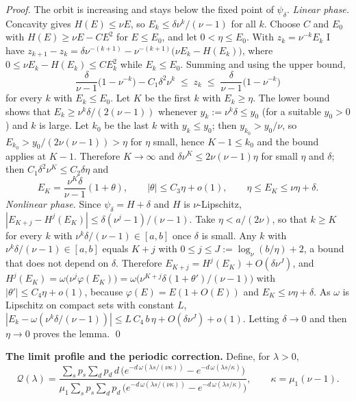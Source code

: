 \documentclass{nws}
\begin{document}
\emph{Proof.} The orbit is increasing and stays below the fixed point of $\psi_\delta$.
\emph{Linear phase.} Concavity gives $H(E)\le\nu E$, so $E_k\le\delta\nu^k/(\nu-1)$
for all $k$. Choose $C$ and $E_0$ with $H(E)\ge\nu E-CE^2$ for $E\le E_0$, and let
$0<\eta\le E_0$. With $z_k=\nu^{-k}E_k$ I have
$z_{k+1}-z_k=\delta\nu^{-(k+1)}-\nu^{-(k+1)}\bigl(\nu E_k-H(E_k)\bigr)$, where
$0\le\nu E_k-H(E_k)\le CE_k^2$ while $E_k\le E_0$. Summing and using the upper bound,
\[
\frac{\delta}{\nu-1}\bigl(1-\nu^{-k}\bigr)-C_1\delta^2\nu^{k}\;\le\;z_k\;\le\;\frac{\delta}{\nu-1}\bigl(1-\nu^{-k}\bigr)
\]
for every $k$ with $E_k\le E_0$. Let $K$ be the first $k$ with $E_k\ge\eta$. The lower
bound shows that $E_k\ge\nu^k\delta/(2(\nu-1))$ whenever $y_k:=\nu^k\delta\le y_0$ (for a suitable $y_0>0$) and $k$ is large. Let $k_0$ be the last $k$ with $y_k\le y_0$; then $y_{k_0}>y_0/\nu$, so $E_{k_0}>y_0/(2\nu(\nu-1))>\eta$ for $\eta$ small, hence $K-1\le k_0$ and the bound applies at $K-1$. Therefore $K\to\infty$ and $\delta\nu^K\le2\nu(\nu-1)\eta$ for small $\eta$ and
$\delta$; then $C_1\delta^2\nu^K\le C_2\delta\eta$ and
\[
E_K=\frac{\nu^K\delta}{\nu-1}(1+\theta),\qquad |\theta|\le C_3\eta+o(1),\qquad \eta\le E_K\le\nu\eta+\delta .
\]
\emph{Nonlinear phase.} Since $\psi_\delta=H+\delta$ and $H$ is $\nu$-Lipschitz,
$|E_{K+j}-H^j(E_K)|\le\delta(\nu^j-1)/(\nu-1)$. Take $\eta<a/(2\nu)$, so that $k\ge K$ for every $k$ with $\nu^k\delta/(\nu-1)\in[a,b]$ once $\delta$ is small. Any $k$ with
$\nu^k\delta/(\nu-1)\in[a,b]$ equals $K+j$ with $0\le j\le J:=\log_\nu(b/\eta)+2$,
a bound that does not depend on $\delta$. Therefore $E_{K+j}=H^j(E_K)+O(\delta\nu^J)$,
and $H^j(E_K)=\omega\bigl(\nu^j\varphi(E_K)\bigr)=\omega\bigl(\nu^{K+j}\delta(1+\theta')/(\nu-1)\bigr)$
with $|\theta'|\le C_4\eta+o(1)$, because $\varphi(E)=E(1+O(E))$ and $E_K\le\nu\eta+\delta$.
As $\omega$ is Lipschitz on compact sets with constant $L$,
$|E_k-\omega(\nu^k\delta/(\nu-1))|\le L\,C_4\,b\,\eta+O(\delta\nu^J)+o(1)$.
Letting $\delta\to0$ and then $\eta\to0$ proves the lemma. \qed

\textbf{The limit profile and the periodic correction.} Define, for $\lambda>0$,
\begin{equation*}
\mathcal Q(\lambda)=\frac{\sum_s p_s\sum_d p_d\,d\,\bigl(e^{-d\,\omega(\lambda s/(\nu\kappa))}-e^{-d\,\omega(\lambda s/\kappa)}\bigr)}
{\mu_1\sum_s p_s\sum_d p_d\,\bigl(e^{-d\,\omega(\lambda s/(\nu\kappa))}-e^{-d\,\omega(\lambda s/\kappa)}\bigr)},\qquad \kappa=\mu_1(\nu-1).
\end{equation*}
\end{document}
